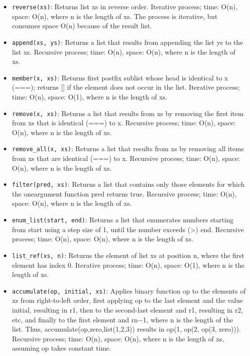 \documentclass[a4paper]{article} \usepackage[backend=biber, style=numeric, sorting=none]{biblatex}
\begin{document}
\begin{multicols*}{4}
\begin{itemize}
\item \texttt{reverse(xs)}: Returns list xs in reverse order. Iterative process; time: O(n), space: O(n), where n is the length of xs. The process is iterative, but consumes space O(n) because of the result list.
\item \texttt{append(xs, ys)}: Returns a list that results from appending the list ys to the list xs. Recursive process; time: O(n), space: O(n), where n is the length of xs.
\item \texttt{member(x, xs)}: Returns first postfix sublist whose head is identical to x (===); returns [] if the element does not occur in the list. Iterative process; time: O(n), space: O(1), where n is the length of xs.
\item \texttt{remove(x, xs)}: Returns a list that results from xs by removing the first item from xs that is identical (===) to x. Recursive process; time: O(n), space: O(n), where n is the length of xs.
\item \texttt{remove\_all(x, xs)}: Returns a list that results from xs by removing all items from xs that are identical (===) to x. Recursive process; time: O(n), space: O(n), where n is the length of xs.
\item \texttt{filter(pred, xs)}: Returns a list that contains only those elements for which the oneargument function pred returns true. Recursive process; time: O(n), space: O(n), where n is the length of xs.
\item \texttt{enum\_list(start, end)}: Returns a list that enumerates numbers starting from start using a step size of 1, until the number exceeds (>) end. Recursive process; time: O(n), space: O(n), where n is the length of xs.
\item \texttt{list\_ref(xs, n)}: Returns the element of list xs at position n, where the first element has index 0. Iterative process; time: O(n), space: O(1), where n is the length of xs.
\item \texttt{accumulate(op, initial, xs)}: Applies binary function op to the elements of xs from right-to-left order, first applying op to the last element and the value initial, resulting in r1, then to the second-last element and r1, resulting in r2, etc, and finally to the first element and rn−1, where n is the length of the list. Thus, accumulate(op,zero,list(1,2,3)) results in op(1, op(2, op(3, zero))). Recursive process; time: O(n), space: O(n), where n is the length of xs, assuming op takes constant time.
\end{itemize}


\end{multicols*}
\end{document}
